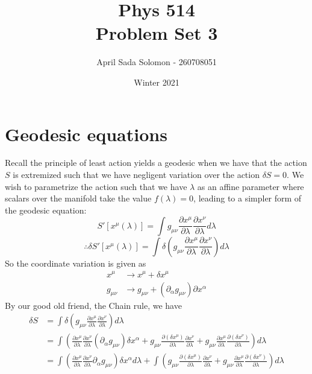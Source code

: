 \documentclass{article}
\title{Phys 514 \\
	\large Problem Set 3}
\author{April Sada Solomon - 260708051}
\date{Winter 2021}
\begin{document}
	\maketitle
	\thispagestyle{empty}
	\pagebreak
	
	\cfoot{\thepage}
	
	\tableofcontents
	\newpage
	
	
	\setcounter{page}{1}
	\cfoot{\thepage}

	\section{Geodesic equations}
	
	Recall the principle of least action yields a geodesic when we have that the action $S$ is extremized such that we have negligent variation over the action $\delta S =0$. We wish to parametrize the action such that we have $\lambda$ as an affine parameter where scalars over the manifold take the value $f(\lambda) = 0$, leading to a simpler form of the geodesic equation:
	\vspace{-0cm}
	$$ S' [x^\mu (\lambda)] = \int g_{\mu \nu} \frac{\partial x^\mu}{\partial \lambda} \frac{\partial x^\nu}{\partial \lambda} d \lambda$$
	$$ \therefore \delta  S' \left[ x^\mu (\lambda)\right] = \int \delta \left(  g_{\mu \nu} \frac{\partial x^\mu}{\partial \lambda} \frac{\partial x^\nu}{\partial \lambda} \right) d \lambda$$
	So the coordinate variation is given as
	\begin{align*}
		x^\mu &\to x^\mu + \delta x^\mu \\
		g_{\mu\nu} &\to g_{\mu\nu} + \left( \partial_\alpha g_{\mu \nu} \right) \partial x^\alpha
	\end{align*}
	By our good old friend, the Chain rule, we have
	\begin{align*}
		\delta S &= \int \delta \left(  g_{\mu \nu} \frac{\partial x^\mu}{\partial \lambda} \frac{\partial x^\nu}{\partial \lambda} \right) d \lambda    \\
		&= \int 
			\left( 
				\frac{\partial x^\mu}{\partial \lambda} \frac{\partial x^\nu}{\partial \lambda} 
				\left( 
					\partial_\alpha g_{\mu\nu} 
				\right)
				\delta x^\alpha 
				+
				g_{\mu\nu} 	\frac{\partial (\delta x^\mu)}{\partial \lambda} \frac{\partial x^\nu}{\partial \lambda}
				+
				g_{\mu\nu} 	\frac{\partial x^\mu}{\partial \lambda} \frac{\partial (\delta x^\nu)}{\partial \lambda}  
			\right) d \lambda \\
		&= \int \left( 
			\frac{\partial x^\mu}{\partial \lambda} \frac{\partial x^\nu}{\partial \lambda} 
			\partial_\alpha g_{\mu\nu} 
			\right)
			\delta x^\alpha  d \lambda	
			+
			\int
			\left(
			g_{\mu\nu} 	\frac{\partial (\delta x^\mu)}{\partial \lambda} \frac{\partial x^\nu}{\partial \lambda}
			+
			g_{\mu\nu} 	\frac{\partial x^\mu}{\partial \lambda} \frac{\partial (\delta x^\nu)}{\partial \lambda}  
			\right) d \lambda	
	\end{align*}
\end{document}

